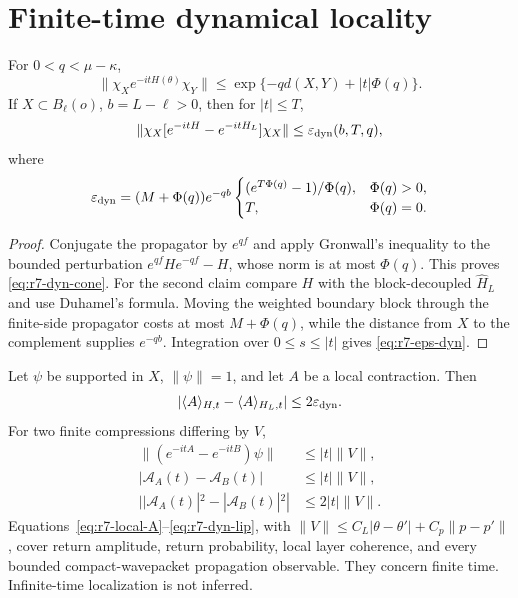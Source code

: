 \section{Finite-time dynamical locality}
\label{sec:r7-dynamics}

\begin{theorem}
\label{thm:r7-dyn}
For $0<q<\mu-\kappa$,
\begin{equation}
 \|\chi_Xe^{-itH(\theta)}\chi_Y\|
 \le \exp\{-qd(X,Y)+|t|\Phi(q)\}.
 \label{eq:r7-dyn-cone}
\end{equation}
If $X\subset B_\ell(o)$, $b=L-\ell>0$, then for $|t|\le T$,
\begin{equation}
 \|\chi_X[e^{-itH}-e^{-itH_L}]\chi_X\|
 \le\varepsilon_{\rm dyn}(b,T,q),
 \label{eq:r7-dyn-trunc}
\end{equation}
where
\begin{equation}
 \varepsilon_{\rm dyn}=
 (M+\Phi(q))e^{-qb}
 \begin{cases}
 (e^{T\Phi(q)}-1)/\Phi(q),&\Phi(q)>0,\\
 T,&\Phi(q)=0.
 \end{cases}
 \label{eq:r7-eps-dyn}
\end{equation}
\end{theorem}

\begin{proof}
Conjugate the propagator by $e^{qf}$ and apply Gronwall's inequality to the
bounded perturbation $e^{qf}He^{-qf}-H$, whose norm is at most $\Phi(q)$.
This proves \eqref{eq:r7-dyn-cone}.  For the second claim compare $H$ with
the block-decoupled $\widehat H_L$ and use Duhamel's formula.  Moving the
weighted boundary block through the finite-side propagator costs at most
$M+\Phi(q)$, while the distance from $X$ to the complement supplies
$e^{-qb}$.  Integration over $0\le s\le |t|$ gives
\eqref{eq:r7-eps-dyn}.
\end{proof}

Let $\psi$ be supported in $X$, $\|\psi\|=1$, and let $A$ be a local
contraction.  Then
\begin{equation}
 |\langle A\rangle_{H,t}-\langle A\rangle_{H_L,t}|
 \le2\varepsilon_{\rm dyn}.
 \label{eq:r7-local-A}
\end{equation}
For two finite compressions differing by $V$,
\begin{align}
 \|(e^{-itA}-e^{-itB})\psi\|&\le |t|\|V\|,\\
 |\mathcal A_A(t)-\mathcal A_B(t)|&\le |t|\|V\|,\\
 ||\mathcal A_A(t)|^2-|\mathcal A_B(t)|^2|&\le2|t|\|V\|.
 \label{eq:r7-dyn-lip}
\end{align}
Equations~\eqref{eq:r7-local-A}--\eqref{eq:r7-dyn-lip}, with
$\|V\|\le C_L|\theta-\theta'|+C_p\|p-p'\|$, cover return amplitude,
return probability, local layer coherence, and every bounded compact-wavepacket
propagation observable.  They concern finite time.  Infinite-time localization
is not inferred.
